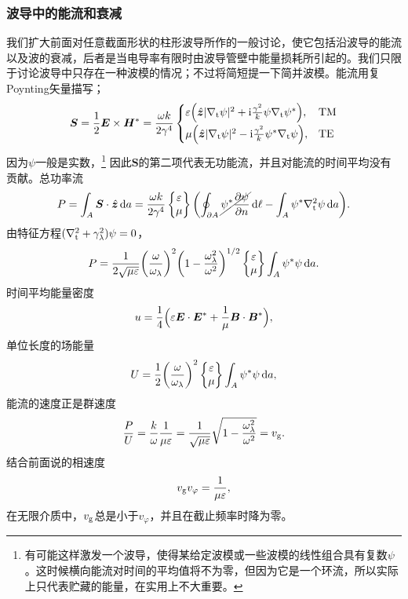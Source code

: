 \subsubsection{波导中的能流和衰减}
我们扩大前面对任意截面形状的柱形波导所作的一般讨论，使它包括沿波导的能流以及波的衰减，后者是当电导率有限时由波导管壁中能量损耗所引起的。我们只限于讨论波导中只存在一种波模的情况；不过将简短提一下简并波模。能流用复Poynting矢量描写；
\begin{equation}
    \bm S=\frac12\bm E\times\bm H^\ast=\frac{\omega k}{2\gamma^4}
    \begin{cases}
        \varepsilon\Bigl(\mathop{}\!\hat{\bm z}|\nabla_\text t\psi|^2+\mathrm{i}\frac{\gamma^2}k\psi\nabla_\text t\psi^\ast\Bigr),&\text{TM}\\[1ex]
        \mu\Bigl(\mathop{}\!\hat{\bm z}|\nabla_\text t\psi|^2-\mathrm{i}\frac{\gamma^2}k\psi^\ast\nabla_\text t\psi\Bigr),&\text{TE}
    \end{cases}
\end{equation}
因为$\psi$一般是实数，\footnote{有可能这样激发一个波导，使得某给定波模或一些波模的线性组合具有复数$\psi$。这时候横向能流对时间的平均值将不为零，但因为它是一个环流，所以实际上只代表贮藏的能量，在实用上不大重要。}
因此$\bm S$的第二项代表无功能流，并且对能流的时间平均没有贡献。总功率流
\[
    P=\int_A\bm S\cdot\uvec z\d a=\frac{\omega k}{2\gamma^4}
    \begin{Bmatrix}
        \varepsilon\\\mu
    \end{Bmatrix}
    \biggkh{\oint_{\p A}\cancel{\psi\cj\pv\psi n}\d\ell-\int_A\psi\cj\nabla_\t^2\psi\d a}.
\]
由特征方程$(\nabla_\text t^2+\gamma_\lambda^2)\psi=0$，
\[
    P=\frac1{2\sqrt{\mu\varepsilon}}\biggl(\frac\omega{\omega_\lambda}\biggr)^2\biggl(1-\frac{\omega_\lambda^2}{\omega^2}\biggr)^{1/2}
    \begin{Bmatrix}
        \varepsilon\\\mu
    \end{Bmatrix}
    \int_A\psi^\ast\psi\mathop{}\!\mathrm{d} a.
\]
时间平均能量密度
\[
    u=\frac14\Bigl(\varepsilon\bm E\cdot\bm E^\ast+\frac1\mu\bm B\cdot\bm B^\ast\Bigr),
\]
单位长度的场能量
\[
    U=\frac12\biggl(\frac\omega{\omega_\lambda}\biggr)^2
    \begin{Bmatrix}
        \varepsilon\\\mu
    \end{Bmatrix}
    \int_A\psi^\ast\psi\mathop{}\!\mathrm{d} a,
\]
能流的速度正是群速度
\[
    \frac PU=\frac k\omega\frac1{\mu\varepsilon}=\frac1{\sqrt{\mu\varepsilon}}\sqrt{1-\frac{\omega_\lambda^2}{\omega^2}}=v_\text g.
\]
结合前面说的相速度
\begin{equation}
    v_\text gv_\varphi=\frac1{\mu\varepsilon},
\end{equation}
在无限介质中，$v_\text g$总是小于$v_\varphi$，并且在截止频率时降为零。
